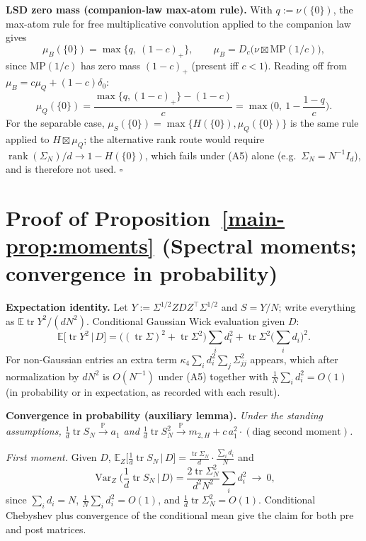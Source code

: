 \textbf{LSD zero mass (companion-law max-atom rule).} With $q:=\nu(\{0\})$, the max-atom rule for free multiplicative convolution \cite{belinschi-atoms,bercovici1993free} applied to the companion law gives
\[
\mu_B(\{0\})=\max\big\{q,\ (1-c)_+\big\},\qquad \mu_B=D_c\big(\nu\boxtimes\mathrm{MP}(1/c)\big),
\]
since $\mathrm{MP}(1/c)$ has zero mass $(1-c)_+$ (present iff $c<1$). Reading off from $\mu_B=c\mu_Q+(1-c)\delta_0$:
\[
\mu_Q(\{0\})=\frac{\max\{q,(1-c)_+\}-(1-c)}{c}=\max\Big(0,\ 1-\frac{1-q}{c}\Big).
\]
For the separable case, $\mu_S(\{0\})=\max\{H(\{0\}),\mu_Q(\{0\})\}$ is the same rule applied to $H\boxtimes\mu_Q$; the alternative rank route would require $\operatorname{rank}(\Sigma_N)/d\to1-H(\{0\})$, which fails under (A5) alone (e.g.\ $\Sigma_N=N^{-1}I_d$), and is therefore not used. $\square$

\section{Proof of Proposition~\ref{main-prop:moments} (Spectral moments; convergence in probability)}\label{sec:S9}

\textbf{Expectation identity.} Let $Y:=\Sigma^{1/2}ZDZ^\top\Sigma^{1/2}$ and $S=Y/N$; write everything as $\mathbb E\operatorname{tr}Y^2/(dN^2)$. Conditional Gaussian Wick evaluation given $D$:
\[
\mathbb E\big[\operatorname{tr}Y^2\,\big|\,D\big]=\big((\operatorname{tr}\Sigma)^2+\operatorname{tr}\Sigma^2\big)\sum_id_i^2+\operatorname{tr}\Sigma^2\Big(\sum_id_i\Big)^2.
\]
For non-Gaussian entries an extra term $\kappa_4\sum_id_i^2\sum_j\Sigma_{jj}^2$ appears, which after normalization by $dN^2$ is $O(N^{-1})$ under (A5) together with $\frac1N\sum_id_i^2=O(1)$ (in probability or in expectation, as recorded with each result).

\textbf{Convergence in probability (auxiliary lemma).} \emph{Under the standing assumptions, $\frac1d\operatorname{tr}S_N\xrightarrow{\mathbb P}a_1$ and $\frac1d\operatorname{tr}S_N^2\xrightarrow{\mathbb P}m_{2,H}+c\,a_1^2\cdot(\text{diag second moment})$.}

\emph{First moment.} Given $D$, $\mathbb E_Z\big[\frac1d\operatorname{tr}S_N\,\big|\,D\big]=\frac{\operatorname{tr}\Sigma_N}{d}\cdot\frac{\sum_id_i}{N}$ and
\[
\operatorname{Var}_Z\Big(\frac1d\operatorname{tr}S_N\,\Big|\,D\Big)=\frac{2\operatorname{tr}\Sigma_N^2}{d^2N^2}\sum_id_i^2\ \longrightarrow\ 0,
\]
since $\sum_id_i=N$, $\frac1N\sum_id_i^2=O(1)$, and $\frac1d\operatorname{tr}\Sigma_N^2=O(1)$. Conditional Chebyshev plus convergence of the conditional mean give the claim for both pre and post matrices.

